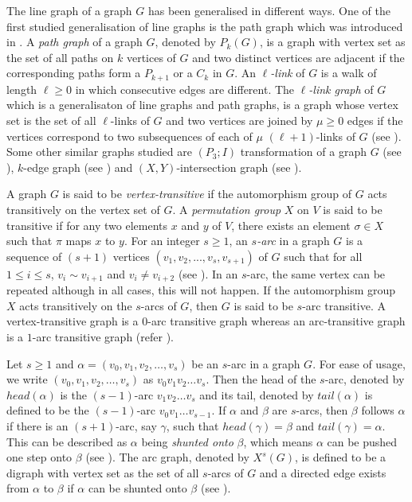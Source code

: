 \documentclass[12pt,a4paper,twoside]{article}
\theoremstyle{casesty}
\theoremstyle{subcasesty}
\theoremstyle{schemesty}
\begin{document}
The line graph of a graph $G$ has been generalised in different ways. One of the first studied generalisation of line graphs is the path graph which was introduced in \cite{broersma1989path}. A \emph{path graph} of a graph $G$, denoted by $P_{k}(G)$, is a graph with vertex set as the set of all paths on $k$ vertices of $G$ and two distinct vertices are adjacent if the corresponding paths form a $P_{k+1}$ or a $C_{k}$ in $G$. An \emph{$\ell$-link} of $G$ is a walk of length $\ell \geq 0$ in which consecutive edges are different. The \emph{$\ell$-link graph} of $G$ which is a generalisaton of line graphs and path graphs, is a graph whose vertex set is the set of all $\ell$-links of $G$ and two vertices are joined by $\mu \geq 0$ edges if the vertices correspond to two subsequences of each of $\mu$ $(\ell+1)$-links of $G$ (see \cite{jia2017hadwiger}). Some other similar graphs studied are $(P_{3};I)$ transformation of a graph $G$ (see \cite{carroll1995subgraph}), $k$-edge graph (see \cite{prisner1994common}) and $(X,Y)$-intersection graph (see \cite{cai1996generalization}).
 
A graph $G$ is said to be \emph{vertex-transitive} if the automorphism group of $G$ acts transitively on the vertex set of $G$. A \emph{permutation group} $X$ on $V$ is said to be transitive if for any two elements $x$ and $y$ of $V$, there exists an element $\sigma \in X$ such that $\pi$ maps $x$ to $y$. For an integer $s \geq 1$, an \emph{$s$-arc} in a graph $G$ is a sequence of $(s+1)$ vertices $(v_{1},v_{2},...,v_{s},v_{s+1})$ of $G$ such that for all $1 \leq i \leq s$, $v_{i} \sim v_{i+1}$ and $v_{i} \neq v_{i+2}$ (see \cite{app1}). In an $s$-arc, the same vertex can be repeated although in all cases, this will not happen. If the automorphism group $X$ acts transitively on the $s$-arcs of $G$, then $G$ is said to be $s$-arc transitive. A vertex-transitive graph is a $0$-arc transitive graph whereas an arc-transitive graph is a $1$-arc transitive graph (refer \cite{app1}). 

Let $s \geq 1$ and $\alpha = (v_{0},v_{1},v_{2},\ldots,v_{s})$ be an $s$-arc in a graph $G$. For ease of usage, we write $(v_{0},v_{1},v_{2},\ldots,v_{s})$ as $v_{0}v_{1}v_{2}\ldots v_{s}$. Then the head of the $s$-arc, denoted by $head(\alpha)$ is the $(s-1)$-arc $v_{1}v_{2}\ldots v_{s}$ and its tail, denoted by $tail(\alpha)$ is defined to be the $(s-1)$-arc $v_{0}v_{1}\ldots v_{s-1}$. If $\alpha$ and $\beta$ are $s$-arcs, then $\beta$ follows $\alpha$ if there is an $(s+1)$-arc, say $\gamma$, such that $head(\gamma) = \beta$ and $tail(\gamma)=\alpha$. This can be described as $\alpha$ being \emph{shunted onto} $\beta$, which means $\alpha$ can be pushed one step onto $\beta$ (see \cite{app1}). The arc graph, denoted by $X^{s}(G)$, is defined to be a digraph with vertex set as the set of all $s$-arcs of $G$ and a directed edge exists from $\alpha$ to $\beta$ if $\alpha$ can be shunted onto $\beta$ (see \cite{app1}).
\end{document}
